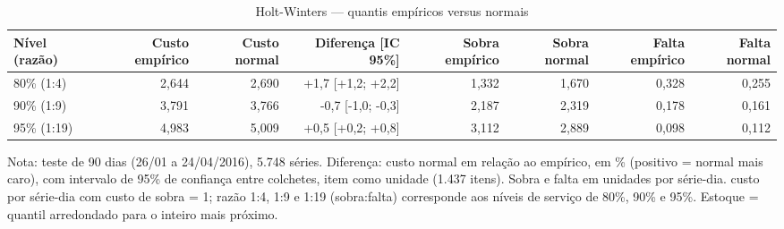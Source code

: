 \begin{table}[htbp]
\centering
\small
\caption{Holt-Winters — quantis empíricos versus normais}
\label{tab:hw_empirico_vs_normal}
\begin{tabular}{lrrrrrrr}
\toprule
Nível (razão) & Custo empírico & Custo normal & Diferença [IC 95\%] & Sobra empírico & Sobra normal & Falta empírico & Falta normal \\
\midrule
80\% (1:4) & 2,644 & 2,690 & +1,7 [+1,2; +2,2] & 1,332 & 1,670 & 0,328 & 0,255 \\
90\% (1:9) & 3,791 & 3,766 & -0,7 [-1,0; -0,3] & 2,187 & 2,319 & 0,178 & 0,161 \\
95\% (1:19) & 4,983 & 5,009 & +0,5 [+0,2; +0,8] & 3,112 & 2,889 & 0,098 & 0,112 \\
\bottomrule
\end{tabular}
\par\smallskip
{\footnotesize Nota: teste de 90 dias (26/01 a 24/04/2016), 5.748 séries. Diferença: custo normal em relação ao empírico, em \% (positivo = normal mais caro), com intervalo de 95\% de confiança entre colchetes, item como unidade (1.437 itens). Sobra e falta em unidades por série-dia. custo por série-dia com custo de sobra = 1; razão 1:4, 1:9 e 1:19 (sobra:falta) corresponde aos níveis de serviço de 80\%, 90\% e 95\%. Estoque = quantil arredondado para o inteiro mais próximo.}
\end{table}
